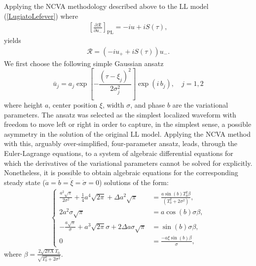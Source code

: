 Applying the NCVA methodology described above to the LL model
(\ref{LugiatoLefever}) where \begin{align}
\left[ \frac{\partial \mathcal{R}}{\partial
u_- }\right]_{\mathrm{PL}} = -iu  + i S(\tau), \end{align}
 yields 
\begin{align}
\mathcal{R} = \left( -iu_{+}  + i S(\tau) \right)u_-.
\end{align}  
%
We first choose the following simple Gaussian ansatz
%
\begin{equation}
\bar{u}_j = a_j \exp\left[-\frac{(\tau-\xi_j)^2}{2\sigma_j^2}\right] \exp(i\,b_j),
\quad j=1,2
\label{eq:4pAnsatz}
\end{equation}
%
where height $a$, center position $\xi$, width $\sigma$, and phase $b$ 
are the variational parameters.  
%
The ansatz was selected as the simplest localized waveform with freedom
to move left or right in order to capture, in the simplest sense,
a possible asymmetry in the solution of the original LL model.
%
Applying the NCVA method with this, arguably 
over-simplified, four-parameter ansatz, 
leads, through the Euler-Lagrange equations, to a system of algebraic 
differential equations for which the derivatives of the variational
parameters cannot be solved for explicitly. Nonetheless, it is
possible to obtain algebraic equations for the corresponding 
steady state ($\dot{a} = \dot{b} = \dot{\xi} = \dot{\sigma} = 0$)
solutions of the form:
%
\begin{align}
\begin{cases}
\frac{a^2\sqrt{\pi}}{2 \sigma^2}+\frac{1}{4} a^4\sqrt{2 \pi}+\Delta a^2\sqrt{\pi} &= \frac{a\sin(b)T_0^2 \beta}
{(T_0^2+2\sigma^2)}, \\[1em]
2a^2\sigma\sqrt{\pi} &=  a \cos(b) \sigma \beta, \\[1em]
-\frac{a\sqrt{\pi}}{\sigma}+a^3\sqrt{2\pi}\sigma+2\Delta a\sigma\sqrt{\pi} &= \sin(b) \sigma \beta, \\[1em]
0 &= \frac{-a\xi\sin(b)\beta}{\sigma},
\end{cases}
\label{4pE}
\end{align}
%
where $\beta = \frac{2\sqrt{2 \pi X} T_0}{\sqrt{T_0^2 + 2 \sigma^2}}$.  



